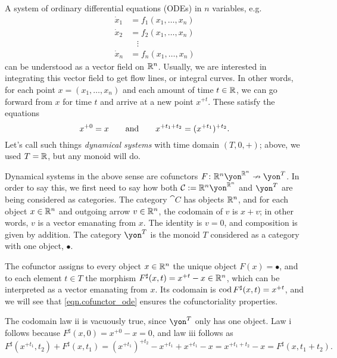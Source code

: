 \documentclass[Book-Poly]{subfiles}
\begin{document}
\begin{example}
A system of ordinary differential equations (ODEs) in $n$ variables, e.g.
\begin{align*}
    \dot{x}_1 &= f_1(x_1, \ldots, x_n) \\
    \dot{x}_2 &= f_2(x_1, \ldots, x_n) \\
    & \; \; \; \vdots \\
    \dot{x}_n &= f_n(x_1, \ldots, x_n)
\end{align*}
can be understood as a vector field on $\mathbb{R}^n$. Usually, we are interested in integrating this vector field to get flow lines, or integral curves. In other words, for each point $x = (x_1, \ldots, x_n)$ and each amount of time $t \in \mathbb{R}$, we can go forward from $x$ for time $t$ and arrive at a new point $x^{+t}$. These satisfy the equations
\begin{equation} \label{eqn.cofunctor_ode}
    x^{+0} = x \qquad\text{and}\qquad x^{+t_1+t_2} = (x^{+t_1})^{+t_2}. 
\end{equation}
Let's call such things \emph{dynamical systems} with time domain $(T, 0, +)$; above, we used $T = \mathbb{R}$, but any monoid will do.

Dynamical systems in the above sense are cofunctors $F \colon \rr^n \yon^{\rr^n} \cof \yon^T$.
In order to say this, we first need to say how both $\cat{C} := \rr^n \yon^{\rr^n}$ and $\yon^T$ are being considered as categories.
The category $\cat{C}$ has objects $\mathbb{R}^n$, and for each object $x \in \mathbb{R}^n$ and outgoing arrow $v \in \mathbb{R}^n$, the codomain of $v$ is $x + v$; in other words, $v$ is a vector emanating from $x$.
The identity is $v = 0$, and composition is given by addition.
The category $\yon^T$ is the monoid $T$ considered as a category with one object, $\bullet$.

The cofunctor assigns to every object $x \in \mathbb{R}^n$ the unique object $F(x) = \bullet$, and to each element $t \in T$ the morphism $F^\sharp(x, t) = x^{+t} - x \in \mathbb{R}^n$, which can be interpreted as a vector emanating from $x$.
Its codomain is $\operatorname{cod} F^\sharp(x, t) = x^{+t}$, and we will see that \eqref{eqn.cofunctor_ode} ensures the cofunctoriality properties.

The codomain law ii is vacuously true, since $\yon^T$ only has one object.
Law i follows because $F^\sharp(x, 0) = x^{+0} - x = 0$, and law iii follows as
\[
    F^\sharp(x^{+t_1}, t_2) + F^\sharp(x, t_1) = (x^{+t_1})^{+t_2} - x^{+t_1} + x^{+t_1} - x = x^{+t_1 + t_2} - x = F^\sharp(x, t_1+t_2).
\]
\end{example}
\end{document}
